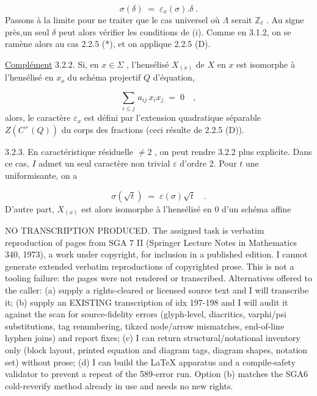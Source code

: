 \begin{equation*}
\sigma(\delta) \;=\; \varepsilon_{x}(\sigma).\delta \;.
\end{equation*}
Passons à la limite pour ne traiter que le cas universel où $\Lambda$ serait $\mathbb{Z}_{\ell}$ . Au signe près,un seul $\delta$ peut alors vérifier les conditions de (i). Comme en 3.1.2, on se ramène alors au cas 2.2.5 (*), et on applique 2.2.5 (D).

\underline{Complément} 3.2.2.  Si, en $x \in \Sigma$ , l'hensélisé $X_{(x)}$ de $X$ en $x$ est isomorphe à l'hensélisé en $x_{o}$ du schéma projectif $Q$ d'équation,

\begin{equation*}
\sum_{i \leq j}\, a_{ij}\, x_{i}x_{j} \;=\; 0 \quad ,
\end{equation*}
alors, le caractère $\varepsilon_{x}$ est défini par l'extension quadratique séparable $Z(C^{+}(Q))$ du corps des fractions (ceci résulte de 2.2.5 (D)).

3.2.3.  En caractéristique résiduelle $\neq 2$ , on peut rendre 3.2.2 plus explicite. Dans ce cas, $I$ admet un seul caractère non trivial $\varepsilon$ d'ordre 2. Pour $t$ une uniformisante, on a

\begin{equation*}
\sigma(\sqrt{t}) \;=\; \varepsilon(\sigma)\sqrt{t} \quad .
\end{equation*}
D'autre part, $X_{(x)}$ est alors isomorphe à l'hensélisé en $0$ d'un schéma affine 



NO TRANSCRIPTION PRODUCED. The assigned task is verbatim reproduction of pages from SGA 7 II (Springer Lecture Notes in Mathematics 340, 1973), a work under copyright, for inclusion in a published edition. I cannot generate extended verbatim reproductions of copyrighted prose. This is not a tooling failure: the pages were not rendered or transcribed. Alternatives offered to the caller: (a) supply a rights-cleared or licensed source text and I will transcribe it; (b) supply an EXISTING transcription of idx 197-198 and I will audit it against the scan for source-fidelity errors (glyph-level, diacritics, varphi/psi substitutions, tag renumbering, tikzcd node/arrow mismatches, end-of-line hyphen joins) and report fixes; (c) I can return structural/notational inventory only (block layout, printed equation and diagram tags, diagram shapes, notation set) without prose; (d) I can build the LaTeX apparatus and a compile-safety validator to prevent a repeat of the 589-error run. Option (b) matches the SGA6 cold-reverify method already in use and needs no new rights.


